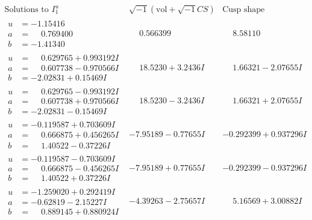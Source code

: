 \documentclass[1p]{elsarticle_modified}
\theoremstyle{definition}
\newcommand{\I}{\sqrt{-1}}
\begin{document}
$$\begin{array}{c|c|c}  
\text{Solutions to }I^u_{1}& \I (\text{vol} + \sqrt{-1}CS) & \text{Cusp shape}\\
 \hline 
\begin{aligned}
u &= -1.15416\phantom{ +0.000000I} \\
a &= \phantom{-}0.769400\phantom{ +0.000000I} \\
b &= -1.41340\phantom{ +0.000000I}\end{aligned}
 & \phantom{-}0.566399\phantom{ +0.000000I} & \phantom{-}8.58110\phantom{ +0.000000I} \\ \hline\begin{aligned}
u &= \phantom{-}0.629765 + 0.993192 I \\
a &= \phantom{-}0.607738 - 0.970566 I \\
b &= -2.02831 + 0.15469 I\end{aligned}
 & \phantom{-}18.5230 + 3.2436 I & \phantom{-}1.66321 - 2.07655 I \\ \hline\begin{aligned}
u &= \phantom{-}0.629765 - 0.993192 I \\
a &= \phantom{-}0.607738 + 0.970566 I \\
b &= -2.02831 - 0.15469 I\end{aligned}
 & \phantom{-}18.5230 - 3.2436 I & \phantom{-}1.66321 + 2.07655 I \\ \hline\begin{aligned}
u &= -0.119587 + 0.703609 I \\
a &= \phantom{-}0.666875 + 0.456265 I \\
b &= \phantom{-}1.40522 - 0.37226 I\end{aligned}
 & -7.95189 - 0.77655 I & -0.292399 + 0.937296 I \\ \hline\begin{aligned}
u &= -0.119587 - 0.703609 I \\
a &= \phantom{-}0.666875 - 0.456265 I \\
b &= \phantom{-}1.40522 + 0.37226 I\end{aligned}
 & -7.95189 + 0.77655 I & -0.292399 - 0.937296 I \\ \hline\begin{aligned}
u &= -1.259020 + 0.292419 I \\
a &= -0.62819 - 2.15227 I \\
b &= \phantom{-}0.889145 + 0.880924 I\end{aligned}
 & -4.39263 - 2.75657 I & \phantom{-}5.16569 + 3.00882 I \\ \hline\begin{aligned}

\end{aligned}
\end{array}$$
\end{document}
